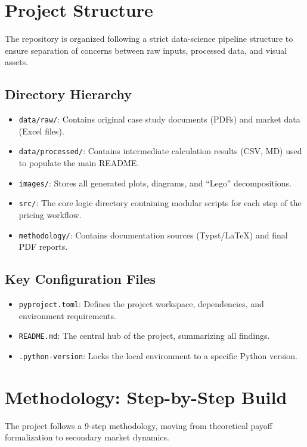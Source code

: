 \documentclass[11pt,a4paper]{article}
\begin{document}
\section{Project Structure}
The repository is organized following a strict data-science pipeline structure to ensure separation of concerns between raw inputs, processed data, and visual assets.

\subsection{Directory Hierarchy}
\begin{itemize}[label=--]
    \item \texttt{data/raw/}: Contains original case study documents (PDFs) and market data (Excel files).
    \item \texttt{data/processed/}: Contains intermediate calculation results (CSV, MD) used to populate the main README.
    \item \texttt{images/}: Stores all generated plots, diagrams, and ``Lego'' decompositions.
    \item \texttt{src/}: The core logic directory containing modular scripts for each step of the pricing workflow.
    \item \texttt{methodology/}: Contains documentation sources (Typst/LaTeX) and final PDF reports.
\end{itemize}

\subsection{Key Configuration Files}
\begin{itemize}[label=--]
    \item \texttt{pyproject.toml}: Defines the project workspace, dependencies, and environment requirements.
    \item \texttt{README.md}: The central hub of the project, summarizing all findings.
    \item \texttt{.python-version}: Locks the local environment to a specific Python version.
\end{itemize}

\section{Methodology: Step-by-Step Build}
The project follows a 9-step methodology, moving from theoretical payoff formalization to secondary market dynamics.
\end{document}
